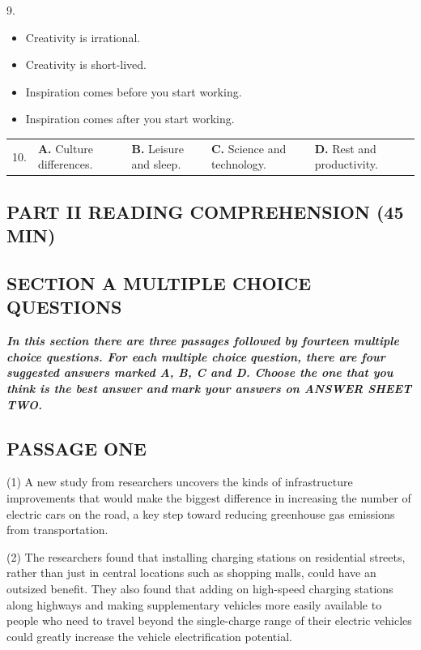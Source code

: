\documentclass[UTF8,11pt]{ctexart}
\begin{document}
9.


\begin{itemize}[leftmargin=2em,itemsep=.2em,topsep=.4em]\item[A.] Creativity is irrational.
\item[B.] Creativity is short-lived.
\item[C.] Inspiration comes before you start working.
\item[D.] Inspiration comes after you start working.
\end{itemize}

\noindent\begin{tabularx}{\linewidth}{@{}lXXXX@{}}10. & \textbf{A.} Culture differences. & \textbf{B.} Leisure and sleep. & \textbf{C.} Science and technology. & \textbf{D.} Rest and productivity.\\\end{tabularx}\par

\subsection*{\textbf{PART II READING COMPREHENSION (45 MIN)}}


\subsection*{\textbf{SECTION A MULTIPLE CHOICE QUESTIONS}}


\textbf{\textit{In this section there are three passages followed by fourteen multiple choice questions. For each multiple choice}} \textbf{\textit{question, there are four suggested answers marked A, B, C and D. Choose the one that you think is the best answer and}} \textbf{\textit{mark your answers on ANSWER SHEET TWO.}}


\subsection*{\textbf{PASSAGE ONE}}


(1) A new study from researchers uncovers the kinds of infrastructure improvements that would make the biggest difference in increasing the number of electric cars on the road, a key step toward reducing greenhouse gas emissions from transportation.


(2) The researchers found that installing charging stations on residential streets, rather than just in central locations such as shopping malls, could have an outsized benefit. They also found that adding on high-speed charging stations along highways and making supplementary vehicles more easily available to people who need to travel beyond the single-charge range of their electric vehicles could greatly increase the vehicle electrification potential.
\end{document}
